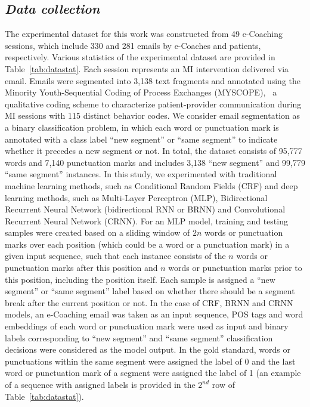 \documentclass{amia}
\begin{document}
\subsection*{\textit{Data collection}}
The experimental dataset for this work was constructed from 49 e-Coaching sessions, which include 330 and 281 emails by e-Coaches and patients, respectively. Various statistics of the experimental dataset are provided in Table~\ref{tab:datastat}. Each session represents an MI intervention delivered via email. Emails were segmented into 3,138 text fragments and annotated using the Minority Youth-Sequential Coding of Process Exchanges (MYSCOPE),~\cite{carcone2013provider} a qualitative coding scheme to characterize patient-provider communication during MI sessions with 115 distinct behavior codes. We consider email segmentation as a binary classification problem, in which each word or punctuation mark is annotated with a class label ``new segment'' or ``same segment'' to indicate whether it precedes a new segment or not. In total, the dataset consists of 95,777 words and 7,140 punctuation marks and includes 3,138 ``new segment'' and 99,779 ``same segment'' instances. In this study, we experimented with traditional machine learning methods, such as Conditional Random Fields (CRF)\cite{lafferty2001conditional} and deep learning methods, such as Multi-Layer Perceptron (MLP),\cite{rumelhart1986learning} Bidirectional Recurrent Neural Network (bidirectional RNN or BRNN)\cite{schuster1997bidirectional} and Convolutional Recurrent Neural Network (CRNN).\cite{treviso2017sentence} For an MLP model, training and testing samples were created based on a sliding window of $2n$ words or punctuation marks over each position (which could be a word or a punctuation mark) in a given input sequence, such that each instance consists of the $n$ words or punctuation marks after this position and $n$ words or punctuation marks prior to this position, including the position itself. Each sample is assigned a ``new segment'' or ``same segment'' label based on whether there should be a segment break after the current position or not. In the case of CRF, BRNN and CRNN models, an e-Coaching email was taken as an input sequence, POS tags and word embeddings of each word or punctuation mark were used as input and binary labels corresponding to ``new segment'' and ``same segment'' classification decisions were considered as the model output. In the gold standard, words or punctuations within the same segment were assigned the label of 0 and the last word or punctuation mark of a segment were assigned the label of 1 (an example of a sequence with assigned labels is provided in the $2^{nd}$ row of Table~\ref{tab:datastat}). \\ 
\end{document}

